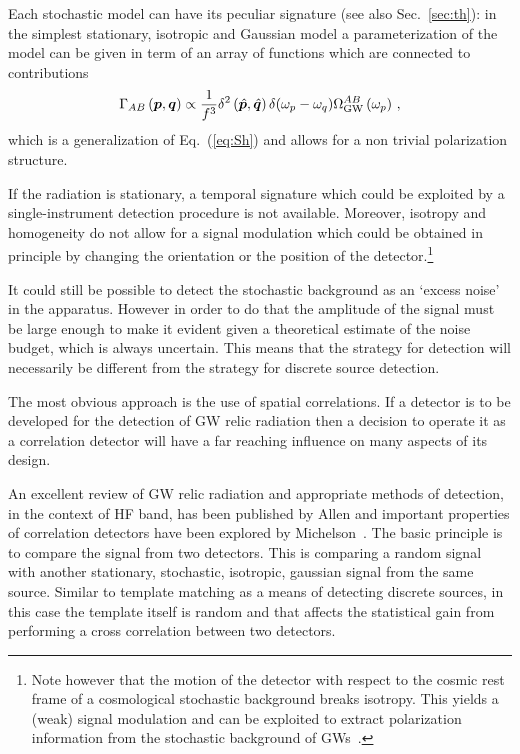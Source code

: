 \documentclass[11pt,a4paper]{article}
\begin{document}
Each stochastic model can have its peculiar signature (see also Sec.~\ref{sec:th}): in the simplest stationary, isotropic and Gaussian model a parameterization of the model can be given in term of an array of functions which are connected to contributions
\begin{equation}
	 \Gamma_{AB}\left(\boldsymbol{p},\boldsymbol{q}\right) \propto \frac{1}{f^3} \delta^2\left(\hat{\boldsymbol{p}},\hat{\boldsymbol{q}}\right) \delta(\omega_p-\omega_q) \Omega_{\rm GW}^{AB}\left(\omega_p\right) \,,
 \end{equation}
which is a generalization of Eq.~(\ref{eq:Sh}) and allows for a non trivial polarization structure.


If the radiation is stationary, a temporal signature which could be exploited by a single-instrument detection procedure is not available. Moreover, isotropy and homogeneity do not allow for a signal modulation which could be obtained in principle by changing the orientation or the position of the detector.\footnote{Note however that the motion of the detector with respect to the cosmic rest frame of a cosmological stochastic background breaks isotropy. This yields a (weak) signal modulation and can be exploited to extract polarization information from the stochastic background of GWs~\cite{Seto:2006hf,Seto:2006dz,Domcke:2019zls}.}

It could still be possible to detect the stochastic background as an `excess noise' in the apparatus. However in order to do that the amplitude of the signal must be large enough to make it evident given a theoretical estimate of the noise budget, which is always uncertain. This means that the strategy for detection will necessarily be different from the strategy for discrete source detection.

The most obvious approach is the use of spatial correlations. If a detector is to be developed for the detection of GW relic radiation then a decision to operate it as a correlation detector will have a far reaching influence on many aspects of its design.

An excellent review of GW relic radiation and appropriate methods of detection, in the context of HF band, has been published by Allen \cite{Allen} and important properties of correlation detectors have been explored by Michelson~\cite{Michelson}. The basic principle is to compare the signal from two detectors. This is comparing a random signal with another stationary, stochastic, isotropic, gaussian signal from the same source. Similar to template matching as a means of detecting discrete sources, in this case the template itself is random and that affects the statistical gain from performing a cross correlation between two detectors.
\end{document}
